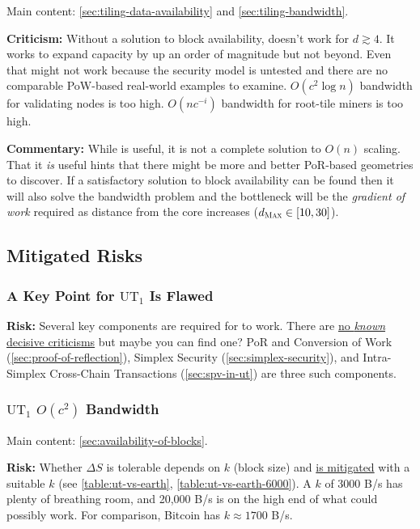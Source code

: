 Main content: \autoref{sec:tiling-data-availability} and \autoref{sec:tiling-bandwidth}. %

\textbf{Criticism:}
Without a solution to block availability, \UTinf{} doesn't work for $d \gtrsim 4$.
It works to expand capacity by up an order of magnitude but not beyond.
Even that might not work because the security model is untested and there are no comparable PoW-based real-world examples to examine.
$O(c^2 \log n)$ bandwidth for validating nodes is too high.
$O(n c^{-i})$ bandwidth for root-tile miners is too high.

\textbf{Commentary:}
While \UTinf{} is useful, it is not a complete solution to $O(n)$ scaling.
That it \emph{is} useful hints that there might be more and better PoR-based geometries to discover.
If a satisfactory solution to block availability can be found then it will also solve the bandwidth problem and the bottleneck will be the \emph{gradient of work} required as distance from the core increases ($d_\textsc{Max} \in [10, 30]$).


\subsection{Mitigated Risks}

\subsubsection{A Key Point for \texorpdfstring{$\text{UT}_1$}{UT₁} Is Flawed}

\textbf{Risk:}
Several key components are required for  to work.
There are \ul{no \emph{known} decisive criticisms} but maybe you can find one?
PoR and Conversion of Work (\autoref{sec:proof-of-reflection}), Simplex Security (\autoref{sec:simplex-security}), and Intra-Simplex Cross-Chain Transactions (\autoref{sec:spv-in-ut}) are three such components.

\subsubsection{\texorpdfstring{$\text{UT}_1$ $O(c^2)$}{UT₁ O(c²)} Bandwidth}

Main content: \autoref{sec:availability-of-blocks}.

\textbf{Risk:}
Whether $\Delta S$ is tolerable depends on $k$ (block size) and \ul{is mitigated} with a suitable $k$ (see \autoref{table:ut-vs-earth}, \autoref{table:ut-vs-earth-6000}).
A $k$ of 3000 B/s has plenty of breathing room, and 20,000 B/s is on the high end of what could possibly work.
For comparison, Bitcoin has $k \approx 1700$ B/s.



